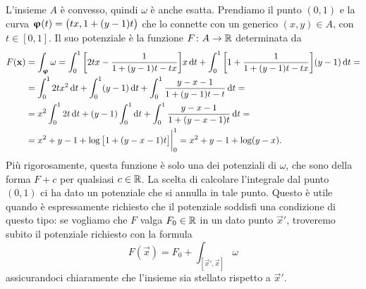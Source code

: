 L'insieme $A$ è convesso, quindi $\omega$ è anche esatta.
Prendiamo il punto $(0,1)$ e la curva $\bm{\upvarphi}(t)=\big(tx,1+(y-1)t\big)$ che lo connette con un generico $(x,y)\in A$, con $t\in[0,1]$.
Il suo potenziale è la funzione $F\colon A\to\mathbb{R}$ determinata da
\begin{equation}
	\begin{split}
		F(\mathbf{x})&=\int_{\bm{\upvarphi}}\omega=\int_0^1\bigg[2tx-\frac1{1+(y-1)t-tx}\bigg]x\,\textup{d} t+\int_0^1\bigg[1+\frac1{1+(y-1)t-tx}\bigg](y-1)\,\textup{d} t=\\
		&=\int_0^12tx^2\,\textup{d} t+\int_0^1(y-1)\,\textup{d} t+\int_0^1\frac{y-x-1}{1+(y-1)t-t}\,\textup{d} t=\\
		&=x^2\int_0^12t\,\textup{d} t+(y-1)\int_0^1\textup{d} t+\int_0^1\frac{y-x-1}{1+(y-x-1)t}\,\textup{d} t=\\
		&=x^2+y-1+\log\big[1+(y-x-1)t\big]\bigg|_0^1=x^2+y-1+\log(y-x).
	\end{split}
\end{equation}
Più rigorosamente, questa funzione è solo una dei potenziali di $\omega$, che sono della forma $F+c$ per qualsiasi $c\in\mathbb{R}$.
La scelta di calcolare l'integrale dal punto $(0,1)$ ci ha dato un potenziale che si annulla in tale punto.
Questo è utile quando è espressamente richiesto che il potenziale soddisfi una condizione di questo tipo: se vogliamo che $F$ valga $F_0\in\mathbb{R}$ in un dato punto $\vec x'$, troveremo subito il potenziale richiesto con la formula
\begin{equation}
	F(\vec x)=F_0+\int_{[\vec x',\vec x]}\omega
\end{equation}
assicurandoci chiaramente che l'insieme sia stellato rispetto a $\vec x'$.
